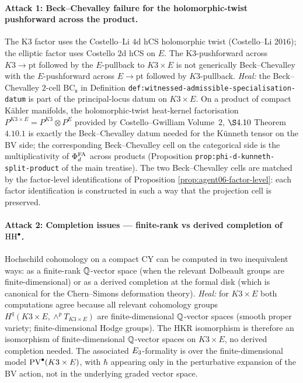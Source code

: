 \paragraph{Attack 1: Beck--Chevalley failure for the holomorphic-twist
pushforward across the product.}
The K3 factor uses the Costello--Li $4$d hCS holomorphic twist
(Costello--Li $2016$); the elliptic factor uses Costello $2$d hCS
on $E$. The K3-pushforward across $K3 \to \mathrm{pt}$ followed by the
$E$-pullback to $K3 \times E$ is not generically Beck--Chevalley with
the $E$-pushforward across $E \to \mathrm{pt}$ followed by
$K3$-pullback. \emph{Heal:} the Beck--Chevalley $2$-cell
$\mathrm{BC}_{\mathfrak s}$ in
Definition \texttt{def:witnessed-admissible-specialisation-datum}
is part of the principal-locus datum on $K3 \times E$. On a product
of compact K\"ahler manifolds, the holomorphic-twist heat-kernel
factorisation $P^{K3 \times E} = P^{K3} \otimes P^E$ provided by
Costello--Gwilliam Volume~$2$, $\S 4.10$ Theorem~$4.10.1$ is exactly
the Beck--Chevalley datum needed for the K\"unneth tensor on the BV
side; the corresponding Beck--Chevalley cell on the categorical side
is the multiplicativity of $\Phi^{\mathrm{FA}}_d$ across products
(Proposition \texttt{prop:phi-d-kunneth-split-product} of the main
treatise). The two Beck--Chevalley cells are matched by the
factor-level identifications of
Proposition \ref{prop:agent06-factor-level}: each factor
identification is constructed in such a way that the projection cell
is preserved.

\paragraph{Attack 2: Completion issues --- finite-rank vs derived
completion of $\mathrm{HH}^\bullet$.}
Hochschild cohomology on a compact CY can be computed in two
inequivalent ways: as a finite-rank $\mathbb Q$-vector space (when the
relevant Dolbeault groups are finite-dimensional) or as a derived
completion at the formal disk (which is canonical for the Chern--Simons
deformation theory). \emph{Heal:} for $K3 \times E$ both computations
agree because all relevant cohomology groups
$H^q(K3 \times E, \wedge^p T_{K3 \times E})$ are finite-dimensional
$\mathbb Q$-vector spaces (smooth proper variety; finite-dimensional Hodge
groups). The HKR isomorphism is therefore an isomorphism of
finite-dimensional $\mathbb Q$-vector spaces on $K3 \times E$, no derived
completion needed. The associated $E_3$-formality is over the
finite-dimensional model $\mathrm{PV}^\bullet(K3 \times E)$, with $\hbar$
appearing only in the perturbative expansion of the BV action,
not in the underlying graded vector space.


